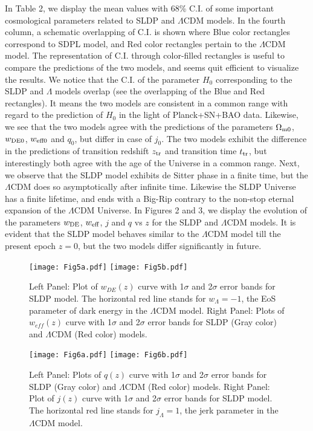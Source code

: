 \documentclass[11pt,a4paper]{article}
\begin{document}
In Table 2, we display the mean values with 68\% C.I. of some important cosmological parameters  related to SLDP and $\Lambda$CDM models. In the fourth column, a schematic overlapping of C.I. is shown where Blue color rectangles correspond to SDPL model, and Red color rectangles pertain to the $\Lambda$CDM model. The representation of C.I. through color-filled rectangles is useful to compare the predictions of the two models, and seems quit efficient to visualize the results. We notice that the C.I. of the parameter $H_0$ corresponding to the SLDP and $\Lambda$ models overlap (see the overlapping of the Blue and Red rectangles). It means the two models are consistent in a common range with regard to the prediction of $H_0$ in the light of Planck+SN+BAO data. Likewise, we see that the two models agree with the predictions of the parameters $\Omega_{\rm m0}$, $w_{\rm DE0}$, $w_{\rm eff0}$ and $q_0$, but differ in case of $j_0$. The two models exhibit the difference in the predictions of transition redshift $z_{\rm tr}$ and transition time $t_{\rm tr}$, but interestingly both agree with the age of the Universe in a common range. Next, we observe that the SLDP model exhibits de Sitter phase in a finite time, but the $\Lambda$CDM does so asymptotically after infinite time. Likewise the SLDP Universe has a finite lifetime, and ends with a Big-Rip contrary to the non-stop eternal expansion of the $\Lambda$CDM Universe. In Figures 2 and 3, we display the evolution of the parameters  $w_{\rm DE}$, $w_{\rm eff}$, $j$ and $q$ vs $z$ for the SLDP and $\Lambda$CDM models. It is evident that the  SLDP model behaves similar to the $\Lambda$CDM model till the present epoch $z=0$, but  the two models differ significantly in future.





\begin{figure}[htb!]\centering
\texttt{[image: Fig5a.pdf]}
\texttt{[image: Fig5b.pdf]}
\caption{\footnotesize{Left Panel: Plot of $w_{DE}(z)$ curve with 1$\sigma$ and 2$\sigma$ error bands for SLDP model. The horizontal red line stands for $w_\Lambda=-1$, the EoS parameter of dark energy in the $\Lambda$CDM model. Right Panel: Plots of $w_{eff}(z)$ curve with 1$\sigma$ and 2$\sigma$ error bands for SLDP (Gray color) and $\Lambda$CDM (Red color) models.}}
\label{fig:5}
\end{figure}

\begin{figure}[htb!]\centering
\texttt{[image: Fig6a.pdf]}
\texttt{[image: Fig6b.pdf]}
\caption{\footnotesize{Left Panel: Plots of $q(z)$ curve with 1$\sigma$ and 2$\sigma$ error bands for SLDP (Gray color) and $\Lambda$CDM (Red color) models. Right Panel: Plot of $j(z)$ curve with 1$\sigma$ and 2$\sigma$ error bands for SLDP model. The horizontal red line stands for $j_\Lambda=1$, the jerk parameter in the $\Lambda$CDM model. }}
\label{fig:5}
\end{figure}
\end{document}
